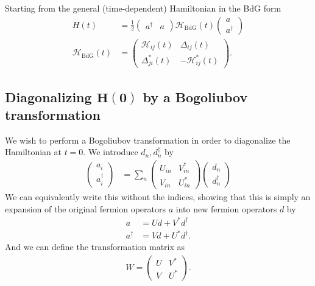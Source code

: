 Starting from the general (time-dependent) Hamiltonian in the BdG form
\begin{align}
    H(t) &= \frac{1}{2} \begin{pmatrix}
        a^\dagger  & a
    \end{pmatrix} \mathcal{H}_\text{BdG}(t)\begin{pmatrix}
        a\\
        a^\dagger
    \end{pmatrix} \label{eq:General_H_BdG}\\
    \mathcal{H}_\text{BdG}(t) &= \begin{pmatrix}
        \mathcal{H}_{ij}(t) & \Delta_{ij}(t)\\
        \Delta_{ji}^*(t) & -\mathcal{H}_{ij}^*(t)
    \end{pmatrix}. \label{eq:General_BdG_Form_H}
\end{align}

\subsection{Diagonalizing $\boldsymbol{H(0)}$ by a Bogoliubov transformation}
We wish to perform a Bogoliubov transformation in order to diagonalize the Hamiltonian at $t = 0$. We introduce $d_n, d_n^\dagger$ by
\begin{align}
    \begin{pmatrix}
        a_i\\
        a_i^\dagger 
    \end{pmatrix} &= \sum_n \begin{pmatrix}
        U_{in} & V_{in}^*\\
        V_{in} & U_{in}^*
    \end{pmatrix} \begin{pmatrix}
        d_n \\
        d_n^\dagger
    \end{pmatrix}
\end{align}
We can equivalently write this without the indices, showing that this is simply an expansion of the original fermion operators $a$ into new fermion operators $d$ by
\begin{align}
    a & = U d + V^* d^\dagger \label{eq:bogoliubov_trans_a}\\
    a^\dagger &= V d + U^* d^\dagger \label{eq:bogoliubov_trans_a_dag}.
\end{align}
And we can define the transformation matrix as
\begin{align}
    W = \begin{pmatrix}
        U & V^*\\
        V & U^*
    \end{pmatrix}.
\end{align}

